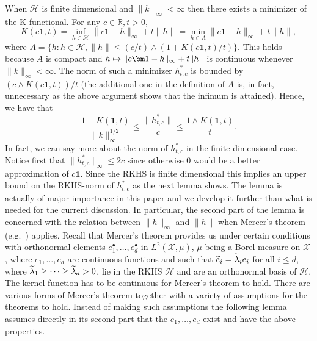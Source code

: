 \documentclass[AHL,Unicode,longabstracts,published]{cedram}
\theoremstyle{remark}
\newcommand{\R}{\mathbb{R}}
\newcommand{\X}{\mathcal{X}}
\newcommand{\cH}{\mathcal{H}}
\let\oldtilde\tilde
\renewcommand*{\tilde}[1]{\mathchoice{\widetilde{#1}}{\widetilde{#1}}{\oldtilde{#1}}{\oldtilde{#1}}}
\let\oldmapsto\mapsto
\renewcommand*{\mapsto}{\mathchoice{\longmapsto}{\oldmapsto}{\oldmapsto}{\oldmapsto}}
\begin{document}
When $\cH$ is finite dimensional and $\|k\|_\infty < \infty$ then there exists a minimizer of the K-functional. For any $c\in \R, t>0$,
\[
K(c \bm 1,t) = \inf_{h\in \cH} \| c \bm 1-h\|_\infty + t\|h\| = \min_{h \in A} \|c \bm 1-h\|_\infty + t\|h\|,
\]
where $A = \{ h : h \in \cH, \|h\| \leq (c/t) \wedge (1+ K(c \bm 1,t)/t)\}$. This holds because $A$ is compact and $h\mapsto \|c \bm 1-h\|_\infty + t \|h\|$ is continuous whenever $\|k\|_\infty < \infty$. The norm of such a minimizer $h_{t,c}^*$ is bounded by $(c \wedge K(c \bm 1,t))/t$ (the additional one in the definition of $A$ is, in fact, unnecessary as the above argument shows that the infimum is attained). Hence, we have that
\[
\frac{1 - K(\bm 1,t)}{\|k\|_\infty^{1/2}} \leq \frac{\|h^*_{t,c}\|}{c} \leq \frac{1 \wedge K(\bm 1,t)}{t}.
\]
In fact, we can say more about the norm of $h^*_{t,c}$ in the finite dimensional case. Notice first that $\|h^*_{t,c}\|_\infty \leq 2c$ since otherwise $0$ would be a better approximation of $c \bm 1$. Since the RKHS is finite dimensional this implies an upper bound on the RKHS-norm of $h^*_{t,c}$ as the next lemma shows. The lemma is actually of major importance in this paper and we develop it further than what is needed for the current discussion. In particular, the second part of the lemma is concerned with the relation between $\|h\|_\infty$ and $\|h\|$ when Mercer's theorem (e.g.~\cite[Theorem~4.49]{STEIN08}) applies. Recall that Mercer's theorem provides us under certain conditions with orthonormal elements $e_1^\bullet, \dots, e_d^\bullet$ in $L^2(\X,\mu)$, $\mu$ being a Borel measure on $\X$, where $e_1,\dots, e_d$ are continuous functions and such that $\tilde e_i = \tilde \lambda_i e_i$ for all $i\leq d$, where $\tilde \lambda_1 \geq \dots \geq \tilde \lambda_d > 0$, lie in the RKHS $\cH$ and are an orthonormal basis of $\cH$. The kernel function has to be continuous for Mercer's theorem to hold. There are various forms of Mercer's theorem together with a variety of assumptions for the theorems to hold. Instead of making such assumptions the following lemma assumes directly in its second part that the $e_1,\dots, e_d$ exist and have the above properties.
\end{document}
